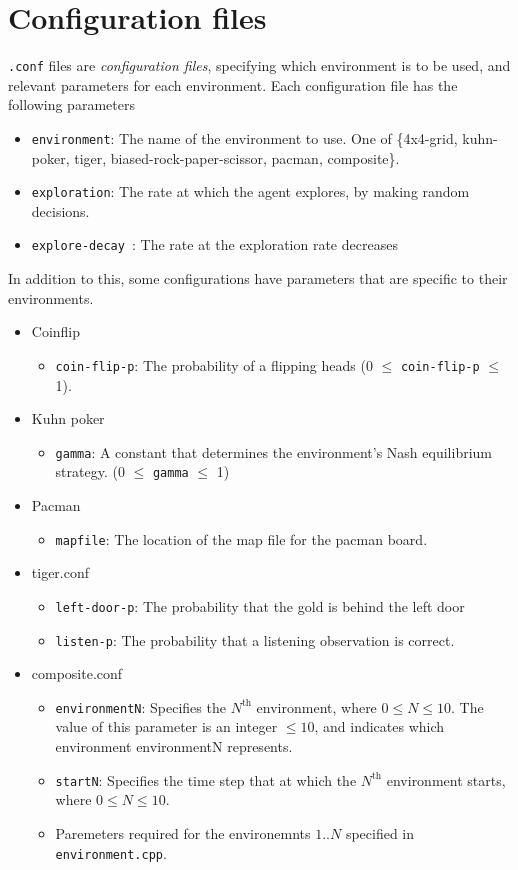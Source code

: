 \documentclass[pdftex,twoside,a4paper]{report}
\begin{document}
\section{Configuration files}
\texttt{.conf} files are \emph{configuration files}, specifying which environment is to be used, and relevant parameters for each environment. Each configuration file has the following parameters
\begin{itemize}
\item \texttt{environment}: The name of the environment to use. One of \{4x4-grid, kuhn-poker, tiger, biased-rock-paper-scissor, pacman, composite\}.
\item \texttt{exploration}: The rate at which the agent explores, by making random decisions.
\item \texttt{explore-decay }: The rate at the exploration rate decreases
\end{itemize}
In addition to this, some configurations have parameters that are specific to their environments.
\begin{itemize}
\item Coinflip
    \begin{itemize}
        \item \texttt{coin-flip-p}: The probability of a flipping heads (0 $\leq$ \texttt{coin-flip-p}  $\leq$ 1).
    \end{itemize}
\item Kuhn poker
    \begin{itemize}
        \item \texttt{gamma}: A constant that determines the environment's Nash equilibrium strategy. (0 $\leq$ \texttt{gamma}  $\leq$ 1)
    \end{itemize}
\item Pacman
    \begin{itemize}
        \item \texttt{mapfile}: The location of the map file for the pacman board.
    \end{itemize}
\item tiger.conf
    \begin{itemize}
        \item \texttt{left-door-p}: The probability that the gold is behind the left door
        \item \texttt{listen-p}: The probability that a listening observation is correct.
    \end{itemize}
\item composite.conf
    \begin{itemize}
        \item \texttt{environmentN}: Specifies the $N^{\text{th}}$ environment, where $0 \leq N \leq 10$. The value of this parameter is an integer $\leq 10$, and indicates which environment environmentN represents.
        \item \texttt{startN}: Specifies the time step that at which the $N^{\text{th}}$ environment starts, where $0 \leq N \leq 10$.
        \item Paremeters required for the environemnts $1..N$ specified in \texttt{environment.cpp}.
    \end{itemize}
\end{itemize}
\end{document}
